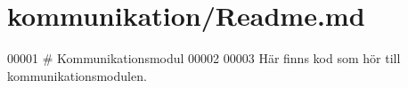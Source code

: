 \hypertarget{kommunikation_2_readme_8md_source}{}\section{kommunikation/\+Readme.md}

\begin{DoxyCode}
00001 # Kommunikationsmodul
00002 
00003 Här finns kod som hör till kommunikationsmodulen.
\end{DoxyCode}
